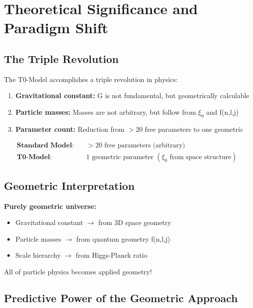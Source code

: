 \documentclass[12pt,a4paper]{article}
\begin{document}
	\section{Theoretical Significance and Paradigm Shift}
	
	\subsection{The Triple Revolution}
	
	The T0-Model accomplishes a triple revolution in physics:
	
	\begin{enumerate}
		\item \textbf{Gravitational constant:} G is not fundamental, but geometrically calculable
		\item \textbf{Particle masses:} Masses are not arbitrary, but follow from $\xi_0$ and f(n,l,j)
		\item \textbf{Parameter count:} Reduction from $>20$ free parameters to one geometric
	\end{enumerate}
	
	\begin{align}
		\textbf{Standard Model:} \quad &>20 \text{ free parameters (arbitrary)}\\
		\textbf{T0-Model:} \quad &1 \text{ geometric parameter } (\xi_0 \text{ from space structure})
	\end{align}
	
	\subsection{Geometric Interpretation}
	
	\begin{tcolorbox}[colback=orange!5!white,colframe=orange!75!black,title=Einstein's Vision Fulfilled]
		\textbf{Purely geometric universe:}
		\begin{itemize}
			\item Gravitational constant $\rightarrow$ from 3D space geometry
			\item Particle masses $\rightarrow$ from quantum geometry f(n,l,j)  
			\item Scale hierarchy $\rightarrow$ from Higgs-Planck ratio
		\end{itemize}
		
		All of particle physics becomes applied geometry!
	\end{tcolorbox}
	
	\subsection{Predictive Power of the Geometric Approach}
	
\end{document}
